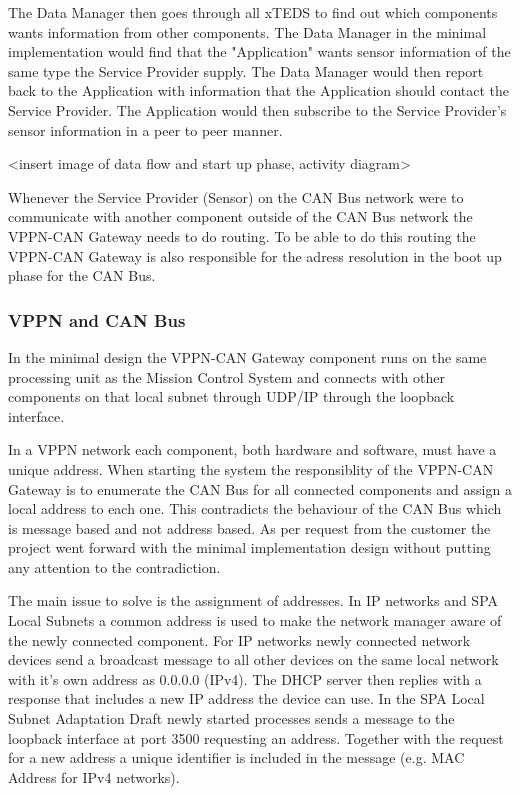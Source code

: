 The Data Manager then goes through all xTEDS to find out which components wants
information from other components. The Data Manager in the minimal
implementation would find that the "Application" wants sensor information of
the same type the Service Provider supply. The Data Manager would then report
back to the Application with information that the Application should contact
the Service Provider. The Application would then subscribe to the Service
Provider's sensor information in a peer to peer manner.

<insert image of data flow and start up phase, activity diagram>

Whenever the Service Provider (Sensor) on the CAN Bus network were to communicate
with another component outside of the CAN Bus network the VPPN-CAN Gateway
needs to do routing. To be able to do this routing the VPPN-CAN Gateway is also
responsible for the adress resolution in the boot up phase for the CAN Bus.

\subsubsection{VPPN and CAN Bus}\label{subsubsec:vppn_can_bus}
In the minimal design the VPPN-CAN Gateway component runs on the same
processing unit as the Mission Control System and connects with other
components on that local subnet through UDP/IP through the loopback interface.

In a VPPN network each component, both hardware and software, must have a unique
address. When starting the system the responsiblity of the VPPN-CAN Gateway is to
enumerate the CAN Bus for all connected components and assign a local address to
each one. This contradicts the behaviour of the CAN Bus which is message based
and not address based. As per request from the customer the project went
forward with the minimal implementation design without putting any attention to
the contradiction.

The main issue to solve is the assignment of addresses. In IP networks and SPA Local
Subnets a common address is used to make the network manager aware of the newly
connected component. For IP networks newly connected network devices send a
broadcast message to all other devices on the same local network with it's own
address as 0.0.0.0 (IPv4). The DHCP server then replies with a response that
includes a new IP address the device can use. In the SPA Local Subnet
Adaptation Draft newly started processes sends a message to the loopback
interface at port 3500 requesting an address. Together with the request for a
new address a unique identifier is included in the message (e.g. MAC Address
for IPv4 networks).


